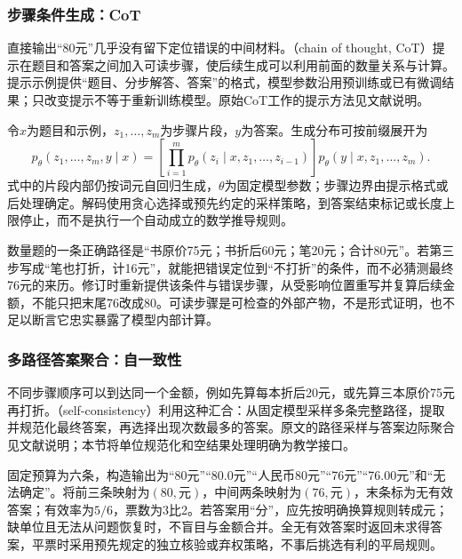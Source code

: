 \subsubsection{步骤条件生成：CoT}
\label{sec:nlp-execution-cot}

直接输出“80元”几乎没有留下定位错误的中间材料。（chain of thought, CoT）提示在题目和答案之间加入可读步骤，使后续生成可以利用前面的数量关系与计算。提示示例提供“题目、分步解答、答案”的格式，模型参数沿用预训练或已有微调结果；只改变提示不等于重新训练模型。原始CoT工作的提示方法见文献说明。

令$x$为题目和示例，$z_1,\ldots,z_m$为步骤片段，$y$为答案。生成分布可按前缀展开为
\begin{equation}
 p_{\theta}(z_1,\ldots,z_m,y\mid x)
 =\left[\prod_{i=1}^{m}p_{\theta}(z_i\mid x,z_1,\ldots,z_{i-1})\right]
 p_{\theta}(y\mid x,z_1,\ldots,z_m).
 \label{eq:nlp-execution-cot}
\end{equation}
式中的片段内部仍按词元自回归生成，$\theta$为固定模型参数；步骤边界由提示格式或后处理确定。解码使用贪心选择或预先约定的采样策略，到答案结束标记或长度上限停止，而不是执行一个自动成立的数学推导规则。

数量题的一条正确路径是“书原价75元；书折后60元；笔20元；合计80元”。若第三步写成“笔也打折，计16元”，就能把错误定位到“不打折”的条件，而不必猜测最终76元的来历。修订时重新提供该条件与错误步骤，从受影响位置重写并复算后续金额，不能只把末尾76改成80。可读步骤是可检查的外部产物，不是形式证明，也不足以断言它忠实暴露了模型内部计算。

\subsubsection{多路径答案聚合：自一致性}
\label{sec:nlp-execution-self-consistency}

不同步骤顺序可以到达同一个金额，例如先算每本折后20元，或先算三本原价75元再打折。（self-consistency）利用这种汇合：从固定模型采样多条完整路径，提取并规范化最终答案，再选择出现次数最多的答案。原文的路径采样与答案边际聚合见文献说明；本节将单位规范化和空结果处理明确为教学接口。

固定预算为六条，构造输出为“80元”“80.0元”“人民币80元”“76元”“76.00元”和“无法确定”。将前三条映射为$(80,\text{元})$，中间两条映射为$(76,\text{元})$，末条标为无有效答案；有效率为$5/6$，票数为3比2。若答案用“分”，应先按明确换算规则转成元；缺单位且无法从问题恢复时，不盲目与金额合并。全无有效答案时返回未求得答案，平票时采用预先规定的独立核验或弃权策略，不事后挑选有利的平局规则。

